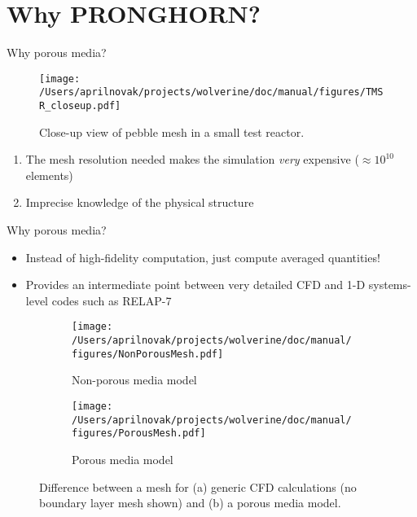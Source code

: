 \documentclass{beamer}
\begin{document}

\section{Why PRONGHORN?}

\begin{frame}{Why porous media?}

\begin{figure}[H]
\centering
\texttt{[image: /Users/aprilnovak/projects/wolverine/doc/manual/figures/TMSR\_closeup.pdf]}
\caption{Close-up view of pebble mesh in a small test reactor.}
\label{fig:TMSRmesh}
\end{figure}

\begin{enumerate}
\item The mesh resolution needed makes the simulation \textit{very} expensive (\(\approx10^{10}\) elements)
\item Imprecise knowledge of the physical structure
\end{enumerate}

\end{frame}


\begin{frame}{Why porous media?}

\begin{itemize}
\item Instead of high-fidelity computation, just compute averaged quantities!
\item Provides an intermediate point between very detailed CFD and 1-D systems-level codes such as RELAP-7\newline
\end{itemize}

\begin{figure}[H]
\centering
\begin{subfigure}{.25\textwidth}
  \centering
  \texttt{[image: /Users/aprilnovak/projects/wolverine/doc/manual/figures/NonPorousMesh.pdf]}
  \caption{Non-porous media model}
\end{subfigure}
\begin{subfigure}{.25\textwidth}
  \centering
  \texttt{[image: /Users/aprilnovak/projects/wolverine/doc/manual/figures/PorousMesh.pdf]}
  \caption{Porous media model}
\end{subfigure}
\caption{Difference between a mesh for (a) generic CFD calculations (no boundary layer mesh shown) and (b) a porous media model.}
\end{figure}

\end{frame}
\end{document}
